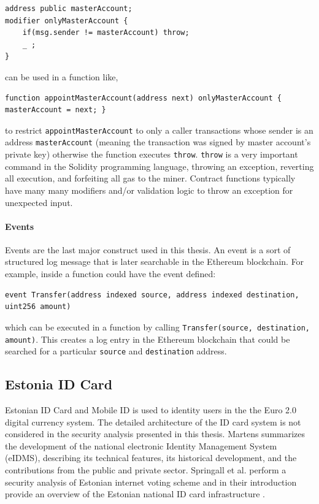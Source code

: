 \documentclass[a4paper,12pt]{article} %
\def\code#1{\texttt{#1}}
\begin{document}
\lstset{basicstyle=\small}
\begin{lstlisting}
address public masterAccount;
modifier onlyMasterAccount {
    if(msg.sender != masterAccount) throw;
    _ ;
}
\end{lstlisting}

can be used in a function like,

\lstset{basicstyle=\scriptsize}
\begin{lstlisting}
function appointMasterAccount(address next) onlyMasterAccount { masterAccount = next; }
\end{lstlisting}

to restrict \code{appointMasterAccount} to only a caller transactions whose sender is an address \code{masterAccount} (meaning the transaction was signed by master account's private key) otherwise the function executes \code{throw}. \code{throw} is a very important command in the Solidity programming language, throwing an exception, reverting all execution, and forfeiting all gas to the miner. Contract functions typically have many many modifiers and/or validation logic to throw an exception for unexpected input.

\paragraph*{Events}

Events are the last major construct used in this thesis. An event is a sort of structured log message that is later searchable in the Ethereum blockchain. For example, inside a function could have the event defined:

\lstset{basicstyle=\scriptsize}
\begin{lstlisting}
event Transfer(address indexed source, address indexed destination, uint256 amount)
\end{lstlisting}

which can be executed in a function by calling \code{Transfer(source, destination, amount)}. This creates a log entry in the Ethereum blockchain that could be searched for a particular \code{source} and \code{destination} address.

\subsection{Estonia ID Card} \label{ssec:2:estoniaIdCard}

Estonian ID Card and Mobile ID is used to identity users in the the Euro 2.0 digital currency system. The detailed architecture of the ID card system is not considered in the security analysis presented in this thesis. Martens summarizes the development of the national electronic Identity Management System (eIDMS), describing its technical features, its historical development, and the contributions from the public and private sector\cite{Martens2010electronicIdentity}. Springall et al. perform a security analysis of Estonian internet voting scheme and in their introduction provide an overview of the Estonian national ID card infrastructure \cite{estoniaInternetVoting}.
\end{document}
